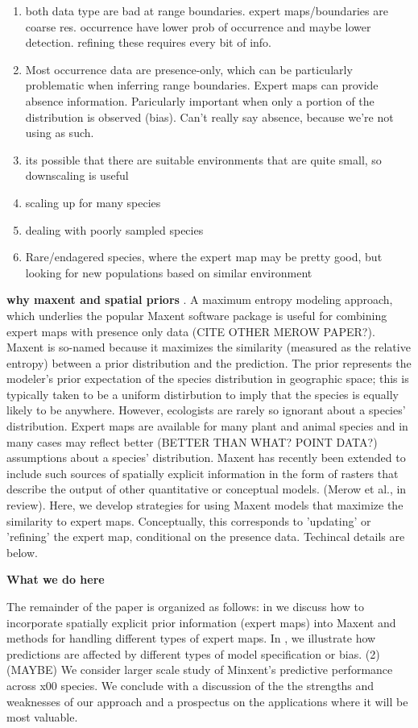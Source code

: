 \begin{enumerate}
  \item both data type are bad at range boundaries. expert maps/boundaries are coarse res. occurrence have lower prob of occurrence and maybe lower detection. refining these requires every bit of info.
  \item Most occurrence data are presence-only, which can be particularly problematic when inferring range boundaries. Expert maps can provide absence information. Paricularly important when only a portion of the distribution is observed (bias). Can't really say absence, because we're not using as such.
  \item its possible that there are suitable environments that are quite small, so downscaling is useful
  \item scaling up for many species
  \item dealing with poorly sampled species
  \item Rare/endagered species, where the expert map may be pretty good, but looking for new populations based on similar environment
  
\end{enumerate}


\textbf{why maxent and spatial priors} .
A maximum entropy modeling approach, which underlies the popular Maxent software package \cite{Phillips:2006vf} is useful for combining expert maps with presence only data (CITE OTHER MEROW PAPER?). Maxent is so-named because it maximizes the similarity (measured as the relative entropy) between a prior distribution and the prediction. The prior represents the modeler's prior expectation of the species distribution in geographic space; this is typically taken to be a uniform distirbution to imply that the species is equally likely to be anywhere. However, ecologists are rarely so ignorant about a species' distribution. Expert maps are available for many plant and animal species and in many cases may reflect better (BETTER THAN WHAT? POINT DATA?) assumptions about a species' distribution. Maxent has recently been extended to include such sources of spatially explicit information in the form of rasters that describe the output of other quantitative or conceptual models. (Merow et al., in review). Here, we develop strategies for using Maxent models that maximize the similarity to expert maps. Conceptually, this corresponds to 'updating' or 'refining' the expert map, conditional on the presence data. Techincal details are below. 


\textbf{What we do here} 

The remainder of the paper is organized as follows: in  we discuss how to incorporate spatially explicit prior information (expert maps) into Maxent and methods for handling different types of expert maps. In , we illustrate how predictions are affected by different types of model specification or bias.  (2) (MAYBE) We consider larger scale study of Minxent's predictive performance across x00 species. We conclude with a discussion of the the strengths and weaknesses of our approach and a prospectus on the applications where it will be most valuable.

  
  
  
  
  